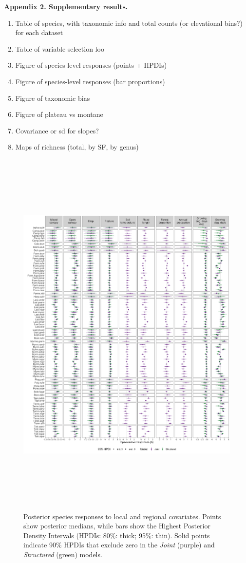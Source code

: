 \documentclass[preprint,review,times,12pt]{elsarticle}
\begin{document}
\textbf{Appendix 2. Supplementary results.}
\begin{enumerate}
    \item Table of species, with taxonomic info and total counts (or elevational bins?) for each dataset
    \item Table of variable selection loo
    \item Figure of species-level responses (points + HPDIs)
    \item Figure of species-level responses (bar proportions)
    \item Figure of taxonomic bias
    \item Figure of plateau vs montane
    \item Covariance or sd for slopes?
    \item Maps of richness (total, by SF, by genus)
\end{enumerate}

\begin{figure}
	\centering\includegraphics[height=7.5in]{ms/1_Ecography/1/figs/b_opt_byParam.png}
	\caption{\label{fig:b_byParam} Posterior species responses to local and regional covariates. Points show posterior medians, while bars show the Highest Posterior Density Intervals (HPDIs: 80\%: thick; 95\%: thin). Solid points indicate 90\% HPDIs that exclude zero in the \emph{Joint} (purple) and \emph{Structured} (green) models.}
\end{figure}
\end{document}
